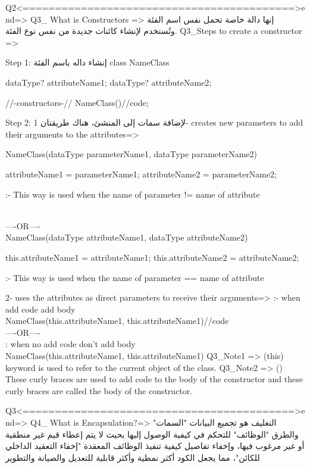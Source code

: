                      Q2<==========================================>end=>
 Q3_ What is Constructors =>
  إنها دالة خاصة تحمل نفس اسم الفئة وتُستخدم لإنشاء كائنات جديدة من نفس نوع الفئة.
Q3_Steps to create a constructor => {
    Step 1: إنشاء داله باسم الفئة
         class NameClass{
             dataType? attributeName1;
             dataType? attributeName2;
             
             //-constructors-//
             NameClass(){//code;}
         } 
    Step 2: لإضافة سمات إلى المنشئ، هناك طريقتان
         1- creates new parameters to add their arguments to the attributes=>{
             NameClass(dataType parameterName1, dataType parameterName2){
                 attributeName1 = parameterName1;
                 attributeName2 = parameterName2;
 
                 \note\1:- This way is used when the name of parameter != name of attribute 
             }
                         \\----OR----\\
              NameClass(dataType attributeName1, dataType attributeName2){               
                 this.attributeName1 = attributeName1;     
                 this.attributeName2 = attributeName2;     
 
                 \note\2:- This way is used when the name of parameter == name of attribute 
             }
 
         }   
         2- uses the attributes as direct parameters to receive their arguments=>{
             \note\1:- when add code add body\\{}
             NameClass(this.attributeName1, this.attributeName1){//code}      
             \\----OR----\\
              \note\2: when no add code don't add body\\{}
             NameClass(this.attributeName1, this.attributeName1)
         }
    Q3_Note1 => (this) keyword is used to refer to the current object of the class.
    Q3_Note2 => ({}) These curly braces are used to add code to the body of the constructor and these curly braces are called the body of the constructor.
}
                     Q3<==========================================>end=>
Q4_ What is Encapsulation?=> 
التغليف هو تجميع البيانات "السمات" والطرق "الوظائف" للتحكم في كيفية الوصول إليها بحيث لا يتم إعطاء قيم غير منطقية أو غير مرغوب فيها، وإخفاء تفاصيل كيفية تنفيذ الوظائف المعقدة "إخفاء التعقيد الداخلي للكائن"، مما يجعل الكود أكثر نمطية وأكثر قابلية للتعديل والصيانة والتطوير

